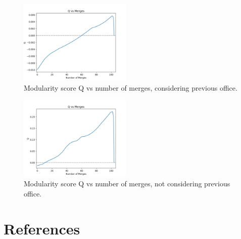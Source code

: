 \documentclass[11pt,twocolumn]{article}
\begin{document}
\begin{figure}[H]
    \centering
    \includegraphics[width=2.1in]{qvm_w_office}
    \caption{Modularity score Q vs number of merges, considering previous office.}
    \label{fig:ds}
\end{figure}
\begin{figure}[H]
    \centering
    \includegraphics[width=2.1in]{qvm_no_office}
    \caption{Modularity score Q vs number of merges, not considering previous office.}
    \label{fig:ds}
\end{figure}
	\section{References}
\end{document}
